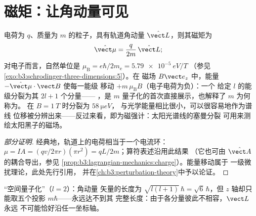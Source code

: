 \section{磁矩：让角动量可见}

\begin{proposition}[轨道磁矩与塞曼效应]\label{prop:b3:quantum-angular-momentum:magnetic}
电荷为 $q$、质量为 $m$ 的粒子，具有轨道角动量
$\hat{\vect L}$，则其磁矩为
\[
\hat{\vect\mu} = \frac{q}{2m}\,\hat{\vect L} ;
\]
对电子而言，自然单位是\emph{}
$\mu_{\text{B}} = e\hbar/2m_{\text{e}} = \qty{5.79e-5}{eV/T}$
（参见\cref{exo:b3:schrodinger-three-dimensions:5}）。在
磁场 $B\vect e_z$ 中，能量 $-\hat{\vect\mu}\cdot\vect B$ 使每一能级
移动 $+m\,\mu_{\text{B}}B$（电子电荷为负）：一个
给定 $l$ 的能级分裂为其 $2l + 1$ 个分量——
\emph{}，是
$m$ 量子化的首次直接展示，也解释了 $m$ 为何称为。
在 $B = \qty{1}{T}$ 时分裂为 $\qty{58}{\micro eV}$，
与光学能量相比很小，可以很容易地作为谱线
位移被分辨出来——反过来看，即为磁强计：太阳光谱线的塞曼分裂
可用来测绘太阳黑子的磁场。
\end{proposition}

\begin{proof}[部分证明]
经典地，轨道上的电荷相当于一个电流环：$\mu = IA =
(qv/2\pi r)(\pi r^2) = qL/2m$；算符表述沿用此结果
（它也可由 $\hat{\vect A}$ 的耦合导出，参见
\cref{prop:b3:lagrangian-mechanics:charge}）。能量移动属于
一级微扰理论，此处先行引用，
并在\cref{ch:b3:perturbation-theory}中予以论证。
\end{proof}

\begin{omfigure}

{\small “空间量子化”（$l = 2$）：角动量
矢量的长度为 $\sqrt{l(l+1)}\,\hbar = \sqrt6\,\hbar$，但
$z$ 轴却只能取五个投影 $m\hbar$——永远达不到其
完整长度：由于各分量彼此不相容，$\vect L$ 永远
不可能恰好沿任一坐标轴。}
\end{omfigure}

